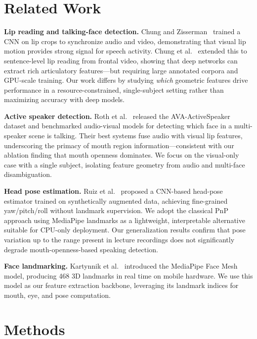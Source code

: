 \documentclass[conference]{IEEEtran}
\begin{document}
\section{Related Work}
\label{sec:related}

\textbf{Lip reading and talking-face detection.}
Chung and Zisserman~\cite{chung2016out} trained a CNN on lip crops to synchronize
audio and video, demonstrating that visual lip motion provides strong signal for
speech activity.
Chung et al.~\cite{chung2017lip} extended this to sentence-level lip reading
from frontal video, showing that deep networks can extract rich articulatory
features—but requiring large annotated corpora and GPU-scale training.
Our work differs by studying \emph{which} geometric features drive performance
in a resource-constrained, single-subject setting rather than maximizing accuracy
with deep models.

\textbf{Active speaker detection.}
Roth et al.~\cite{roth2020ava} released the AVA-ActiveSpeaker dataset and
benchmarked audio-visual models for detecting which face in a multi-speaker scene
is talking.
Their best systems fuse audio with visual lip features, underscoring the primacy
of mouth region information—consistent with our ablation finding that mouth
openness dominates.
We focus on the visual-only case with a single subject, isolating feature
geometry from audio and multi-face disambiguation.

\textbf{Head pose estimation.}
Ruiz et al.~\cite{ruiz2018finegrained} proposed a CNN-based head-pose estimator
trained on synthetically augmented data, achieving fine-grained yaw/pitch/roll
without landmark supervision.
We adopt the classical PnP approach using MediaPipe landmarks as a lightweight,
interpretable alternative suitable for CPU-only deployment.
Our generalization results confirm that pose variation up to the range present
in lecture recordings does not significantly degrade mouth-openness-based
speaking detection.

\textbf{Face landmarking.}
Kartynnik et al.~\cite{kartynnik2019realtime} introduced the MediaPipe Face
Mesh model, producing 468 3D landmarks in real time on mobile hardware.
We use this model as our feature extraction backbone, leveraging its landmark
indices for mouth, eye, and pose computation.

\section{Methods}
\label{sec:methods}
\end{document}
